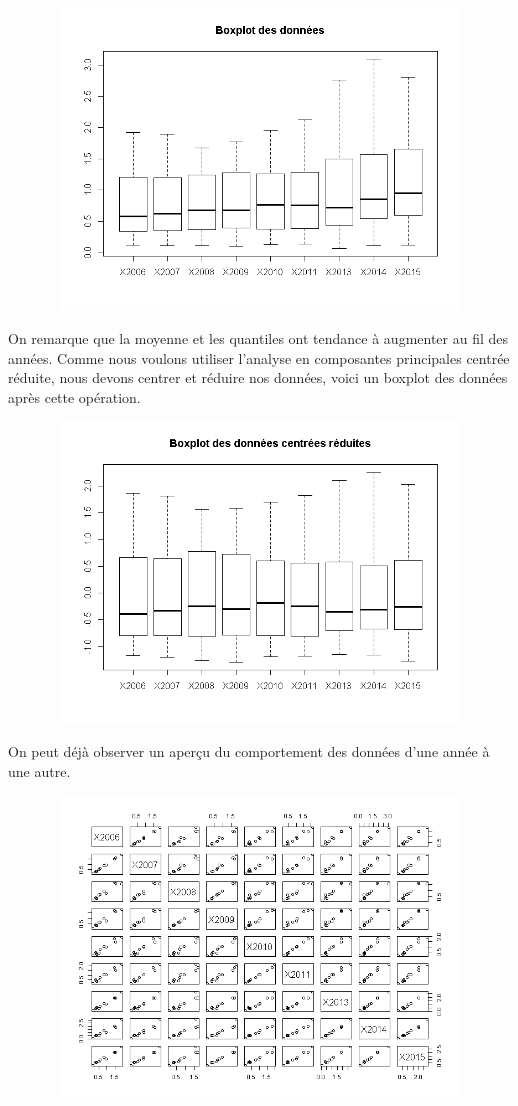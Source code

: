 \documentclass{article}
\begin{document}
 \includegraphics[width=15cm,height=8cm]{"Boxplot1"}
 
On remarque que la moyenne et les quantiles ont tendance à augmenter au fil des années. Comme nous voulons utiliser l'analyse en composantes principales centrée réduite, nous devons centrer et réduire nos données, voici un boxplot des données après cette opération.

 \includegraphics[width=15cm,height=8cm]{"Boxplot2"} 
 
On peut déjà observer un aperçu du comportement des données d'une année à une autre. 

 \includegraphics[width=15cm,height=8cm]{"pairs"}
 
\end{document}
